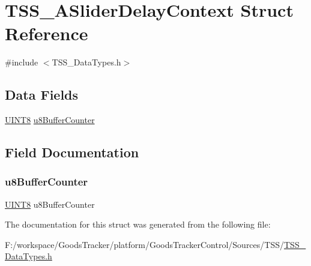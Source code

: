 \hypertarget{struct_t_s_s___a_slider_delay_context}{}\section{T\+S\+S\+\_\+\+A\+Slider\+Delay\+Context Struct Reference}
\label{struct_t_s_s___a_slider_delay_context}


{\ttfamily \#include $<$T\+S\+S\+\_\+\+Data\+Types.\+h$>$}

\subsection*{Data Fields}
\begin{DoxyCompactItemize}
\item 
\hyperlink{_t_s_s___data_types_8h_ab27e9918b538ce9d8ca692479b375b6a}{U\+I\+N\+T8} \hyperlink{struct_t_s_s___a_slider_delay_context_af49a14568842088425e14123f892f482}{u8\+Buffer\+Counter}
\end{DoxyCompactItemize}


\subsection{Field Documentation}
\mbox{\label{struct_t_s_s___a_slider_delay_context_af49a14568842088425e14123f892f482}} 
\subsubsection{\texorpdfstring{u8\+Buffer\+Counter}{u8BufferCounter}}
{\footnotesize\ttfamily \hyperlink{_t_s_s___data_types_8h_ab27e9918b538ce9d8ca692479b375b6a}{U\+I\+N\+T8} u8\+Buffer\+Counter}



The documentation for this struct was generated from the following file\+:\begin{DoxyCompactItemize}
\item 
F\+:/workspace/\+Goods\+Tracker/platform/\+Goods\+Tracker\+Control/\+Sources/\+T\+S\+S/\hyperlink{_t_s_s___data_types_8h}{T\+S\+S\+\_\+\+Data\+Types.\+h}\end{DoxyCompactItemize}
